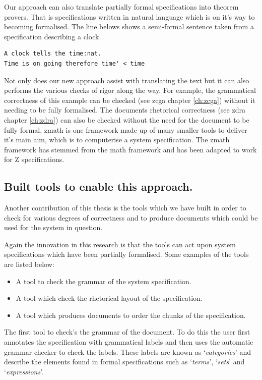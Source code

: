 Our approach can also translate partially formal specifications into theorem
provers. That is specifications written in natural language which is on it's way
to becoming formalised. The line belows shows a semi-formal sentence taken from
a specification describing a clock.

\begin{verbatim}
A clock tells the time:nat.
Time is on going therefore time' < time
\end{verbatim}

Not only does our new approach assist with translating the text but it can also
performs the various checks of rigor along the way. For example, the grammatical
correctness of this example can be checked (see \gls{zcga} chapter
\ref{ch:zcga}) without it needing to be fully formalised. The documents
rhetorical correctness (see \gls{zdra} chapter \ref{ch:zdra}) can also be
checked without the need for the document to be fully formal. \Gls{zmath} is one
framework made up of many smaller tools to deliver it's main aim, which is to
computerise a system specification. The \gls{zmath} framework has stemmed from
the \gls{math} framework \cite{mathintomizar} and has been adapted to work for Z
specifications.

\subsection{Built tools to enable this approach.}

Another contribution of this thesis is the tools which we have built in order to
check for various degrees of correctness and to produce documents which could be
used for the system in question.

Again the innovation in this research is that the tools can act upon system
specifications which have been partially formalised. Some examples of the tools
are listed below:

\begin{itemize}
\item A tool to check the grammar of the system specification.

\item A tool which check the rhetorical layout of the specification.

\item A tool which produces documents to order the chunks of the specification.
\end{itemize}

The first tool to check's the grammar of the document. To do this the user first
annotates the specification with grammatical labels and then uses the automatic
grammar checker to check the labels. These labels are known as
`\emph{categories}' and describe the elements found in formal specifications
such as `\emph{terms}', `\emph{sets}' and `\emph{expressions}'. 

